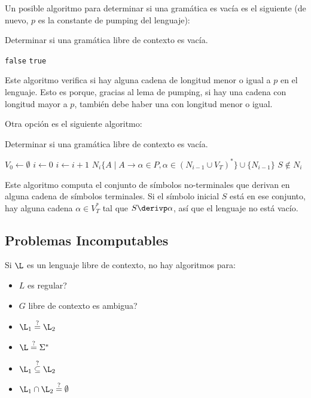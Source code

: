 Un posible algoritmo para determinar si una gramática es vacía es el siguiente (de nuevo, $p$ es la constante de pumping del lenguaje):
\begin{algorithm}[H]
    \caption{Determinar si una gramática libre de contexto es vacía.}
    \label{glc-vacia}
    \begin{algorithmic}[1]
        \State \Return \texttt{false}
        \Else
        \State \Return \texttt{true}
        \EndIf
        \EndProcedure
    \end{algorithmic}
\end{algorithm}

Este algoritmo verifica si hay alguna cadena de longitud menor o igual a $p$ en el lenguaje. Esto es porque, gracias al lema de pumping, si hay una cadena con longitud mayor a $p$, también debe haber una con longitud menor o igual.

Otra opción es el siguiente algoritmo:

\begin{algorithm}[H]
    \caption{Determinar si una gramática libre de contexto es vacía.}
    \label{glc-vacia2}
    \begin{algorithmic}[1]
        \State $V_0 \gets \emptyset$
        \State $i \gets 0$
        \Repeat
        \State $i \gets i + 1$
        \State $N_i \{A \mid A \to \alpha \in P, \alpha \in (N_{i - 1} \cup V_T)^*\} \cup \{N_{i - 1}\}$
        \State \Return $S \notin N_i$
        \EndProcedure
    \end{algorithmic}
\end{algorithm}

Este algoritmo computa el conjunto de símbolos no-terminales que derivan en alguna cadena de símbolos terminales. Si el símbolo inicial $S$ está en ese conjunto, hay alguna cadena $\alpha \in V_T^*$ tal que $S \derivp \alpha$, así que el lenguaje no está vacío.

\subsection{Problemas Incomputables}

Si $\L$ es un lenguaje libre de contexto, no hay algoritmos para:
\begin{itemize}
    \item $L$ es regular?
    \item $G$ libre de contexto es ambigua?
    \item $\L_1 \overset{?}{=} \L_2$
    \item $\L \overset{?}{=} \Sigma^*$
    \item $\L_1 \overset{?}{\subseteq} \L_2$
    \item $\L_1 \cap \L_2 \overset{?}{=} \emptyset$
\end{itemize}
